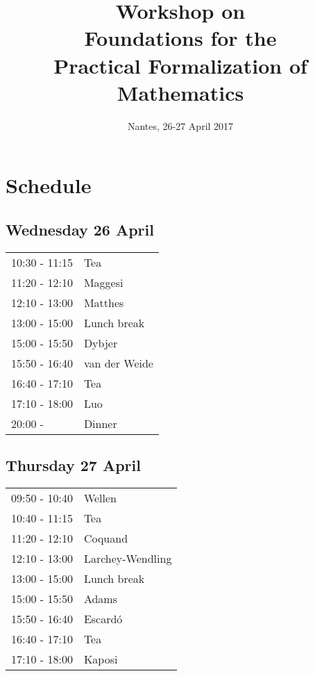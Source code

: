 \documentclass[a4paper,10pt]{scrartcl}
\title{Workshop on \\ Foundations for the \\ Practical Formalization of Mathematics}
\author{}
\begin{document}
\date{Nantes, 26-27 April 2017}
\maketitle

% 

\section*{Schedule}

\subsection*{Wednesday 26 April}

\begin{tabular}{ll}

10:30 - 11:15 & Tea \\
11:20 - 12:10 & Maggesi \\
12:10 - 13:00  & Matthes \\
13:00 - 15:00  & Lunch break\\
15:00 - 15:50  & Dybjer\\
15:50 - 16:40  & van der Weide \\
16:40 - 17:10  & Tea \\
17:10 - 18:00  & Luo \\
20:00 -        & Dinner
\end{tabular}

\subsection*{Thursday 27 April}


\begin{tabular}{ll}

09:50 - 10:40 & Wellen \\
10:40 - 11:15 & Tea \\
11:20 - 12:10 & Coquand \\
12:10 - 13:00 & Larchey-Wendling \\
13:00 - 15:00 & Lunch break \\
15:00 - 15:50 & Adams \\
15:50 - 16:40 & Escardó \\
16:40 - 17:10 & Tea \\
17:10 - 18:00 & Kaposi \\ 
\end{tabular}
\end{document}
